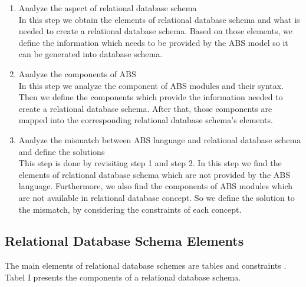 \documentclass[conference]{IEEEtran}
\begin{document}
\begin{enumerate}
	\item Analyze the aspect of relational database schema\\
	In this step we obtain the elements of relational database schema and what is needed to create a relational database schema. Based on those elements, we define the information which needs to be provided by the ABS model so it can be generated into database schema.
	\item Analyze the components of ABS\\
	In this step we analyze the component of ABS modules and their syntax. Then we define the components which provide the information needed to create a relational database schema. After that, those components are mapped into the corresponding relational database schema’s elements.
	\item Analyze the mismatch between ABS language and relational database schema and define the solutions\\
	This step is done by revisiting step 1 and step 2. In this step we find the elements of relational database schema which are not provided by the ABS language. Furthermore, we also find the components of ABS modules which are not available in relational database concept. So we define the solution to the mismatch, by considering the constraints of each concept.
\end{enumerate}

\subsection{Relational Database Schema Elements}
The main elements of relational database schemes are tables and constraints \cite{book2}. Tabel I presents the components of a relational database schema.
\end{document}
